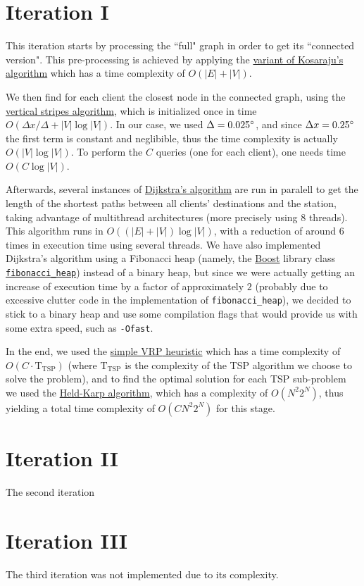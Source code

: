\section{Iteration I}
This iteration starts by processing the ``full" graph in order to get its ``connected version". This pre-processing is achieved by applying the \hyperref[algorithm-scc-kosaraju-v]{variant of Kosaraju's algorithm} which has a time complexity of $O(|E| + |V|)$.\par
We then find for each client the closest node in the connected graph, using the \hyperref[algorithm-vstripes]{vertical stripes algorithm}, which is initialized once in time $O(\Delta x / \Delta + |V| \log |V|)$. In our case, we used $\Delta = 0.025\degree$, and since $\Delta x = 0.25\degree$ the first term is constant and neglibible, thus the time complexity is actually $O(|V| \log |V|)$. To perform the $C$ queries (one for each client), one needs time $O(C \log |V|)$.\par
Afterwards, several instances of \hyperref[algorithm-shortestpath-dijkstra]{Dijkstra's algorithm} are run in paralell to get the length of the shortest paths between all clients' destinations and the station, taking advantage of multithread architectures (more precisely using 8 threads). This algorithm runs in $O((|E|+|V|) \log |V|)$, with a reduction of around 6 times in execution time using several threads. We have also implemented Dijkstra's algorithm using a Fibonacci heap (namely, the \href{https://www.boost.org/}{Boost} library class \href{https://www.boost.org/doc/libs/1_49_0/doc/html/boost/heap/fibonacci_heap.html}{\texttt{fibonacci\_heap}}) instead of a binary heap, but since we were actually getting an increase of execution time by a factor of approximately $2$ (probably due to excessive clutter code in the implementation of \texttt{fibonacci\_heap}), we decided to stick to a binary heap and use some compilation flags that would provide us with some extra speed, such as \texttt{-Ofast}.
\par
In the end, we used the \hyperref[algorithm-vrp-heuristic]{simple \acrshort*{VRP} heuristic} which has a time complexity of $O(C \cdot \text{T}_\text{TSP})$ (where $\text{T}_\text{TSP}$ is the complexity of the \acrshort{TSP} algorithm we choose to solve the problem), and to find the optimal solution for each \acrshort{TSP} sub-problem we used the \hyperref[algorithm-tsp-heldkarp]{Held-Karp algorithm}, which has a complexity of $O(N^2 2^N)$, thus yielding a total time complexity of $O(C N^2 2^N)$ for this stage.


\section{Iteration II}
The second iteration 

\section{Iteration III}
The third iteration was not implemented due to its complexity.

